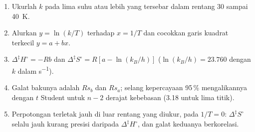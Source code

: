 \begin{method}\label{met:b3:rate-theories:eyring-plot}
\begin{enumerate}
  \item Ukurlah $k$ pada lima suhu atau lebih yang tersebar dalam rentang 30
        sampai \qty{40}{K}.
  \item Alurkan $y = \ln(k/T)$ terhadap $x = 1/T$ dan cocokkan garis kuadrat
        terkecil $y = a + bx$.
  \item $\Delta^{\ddagger}H^\circ = -Rb$ dan $\Delta^{\ddagger}S^\circ = R[a - \ln(k_B/h)]$
        ($\ln(k_B/h) = 23.760$ dengan $k$ dalam \unit{s^{-1}}).
  \item Galat bakunya adalah $Rs_b$ dan $Rs_a$; selang kepercayaan 95\,\%
        mengalikannya dengan $t$ Student untuk $n - 2$ derajat kebebasan
        (3.18 untuk lima titik).
  \item Perpotongan terletak jauh di luar rentang yang diukur, pada
        $1/T = 0$: $\Delta^{\ddagger}S^\circ$ selalu jauh kurang presisi daripada
        $\Delta^{\ddagger}H^\circ$, dan galat keduanya berkorelasi.
\end{enumerate}
\end{method}


